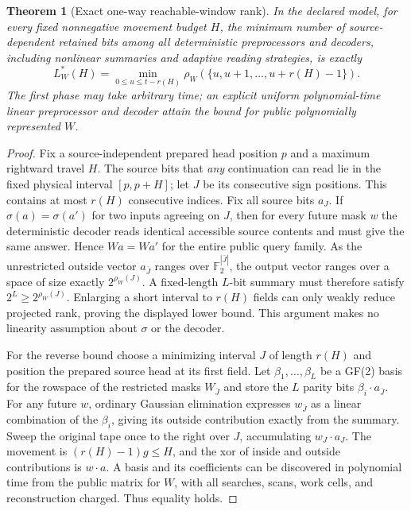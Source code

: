 \documentclass[10pt]{article}
\newtheorem{theorem}{Theorem}
\newcommand{\F}{\mathbb F_2}
\begin{document}
\begin{theorem}[Exact one-way reachable-window rank]\label{th:window}
In the declared model, for every fixed nonnegative movement budget $H$, the minimum number of source-dependent retained bits among \emph{all deterministic preprocessors and decoders}, including nonlinear summaries and adaptive reading strategies, is exactly
\[
\boxed{L^*_W(H)=\min_{0\le u\le t-r(H)}\rho_W(\{u,u+1,\ldots,u+r(H)-1\}).}\]
The first phase may take arbitrary time; an explicit uniform polynomial-time linear preprocessor and decoder attain the bound for public polynomially represented $W$.
\end{theorem}
\begin{proof}
Fix a source-independent prepared head position $p$ and a maximum rightward travel $H$. The source bits that \emph{any} continuation can read lie in the fixed physical interval $[p,p+H]$; let $J$ be its consecutive sign positions. This contains at most $r(H)$ consecutive indices. Fix all source bits $a_J$. If $\sigma(a)=\sigma(a')$ for two inputs agreeing on $J$, then for every future mask $w$ the deterministic decoder reads identical accessible source contents and must give the same answer. Hence $Wa=Wa'$ for the entire public query family. As the unrestricted outside vector $a_{\bar J}$ ranges over $\F^{|\bar J|}$, the output vector ranges over a space of size exactly $2^{\rho_W(J)}$. A fixed-length $L$-bit summary must therefore satisfy $2^L\ge2^{\rho_W(J)}$. Enlarging a short interval to $r(H)$ fields can only weakly reduce projected rank, proving the displayed lower bound. This argument makes no linearity assumption about $\sigma$ or the decoder.

For the reverse bound choose a minimizing interval $J$ of length $r(H)$ and position the prepared source head at its first field. Let $\beta_1,\ldots,\beta_L$ be a GF(2) basis for the rowspace of the restricted masks $W_{\bar J}$ and store the $L$ parity bits $\beta_i\cdot a_{\bar J}$. For any future $w$, ordinary Gaussian elimination expresses $w_{\bar J}$ as a linear combination of the $\beta_i$, giving its outside contribution exactly from the summary. Sweep the original tape once to the right over $J$, accumulating $w_J\cdot a_J$. The movement is $(r(H)-1)g\le H$, and the xor of inside and outside contributions is $w\cdot a$. A basis and its coefficients can be discovered in polynomial time from the public matrix for $W$, with all searches, scans, work cells, and reconstruction charged. Thus equality holds.\qedhere
\end{proof}
\end{document}
